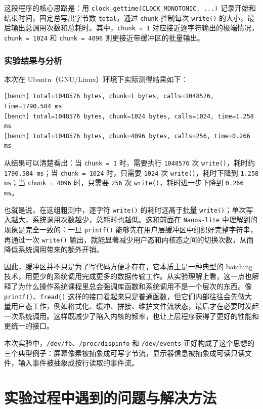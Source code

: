 \documentclass[a4paper]{article}
\begin{document}
这段程序的核心思路是：用 \texttt{clock\_gettime(CLOCK\_MONOTONIC, ...)} 记录开始和结束时间，固定总写出字节数 \texttt{total}，通过 \texttt{chunk} 控制每次 \texttt{write()} 的大小，最后输出总调用次数和总耗时。其中，\texttt{chunk = 1} 对应接近逐字符输出的极端情况，\texttt{chunk = 1024} 和 \texttt{chunk = 4096} 则更接近带缓冲区的批量输出。

\subsubsection*{实验结果与分析}
本次在 Ubuntu（GNU/Linux）环境下实际测得结果如下：
\begin{lstlisting}[language={}]
[bench] total=1048576 bytes, chunk=1 bytes, calls=1048576, time=1790.584 ms
[bench] total=1048576 bytes, chunk=1024 bytes, calls=1024, time=1.258 ms
[bench] total=1048576 bytes, chunk=4096 bytes, calls=256, time=0.266 ms
\end{lstlisting}

从结果可以清楚看出：当 \texttt{chunk = 1} 时，需要执行 \texttt{1048576} 次 \texttt{write()}，耗时约 \texttt{1790.584 ms}；当 \texttt{chunk = 1024} 时，只需要 \texttt{1024} 次 \texttt{write()}，耗时下降到 \texttt{1.258 ms}；当 \texttt{chunk = 4096} 时，只需要 \texttt{256} 次 \texttt{write()}，耗时进一步下降到 \texttt{0.266 ms}。

也就是说，在这组粗测中，逐字符 \texttt{write()} 的耗时远高于批量 \texttt{write()}；单次写入越大，系统调用次数越少，总耗时也越低。这和前面在 \texttt{Nanos-lite} 中理解到的现象是完全一致的：一旦 \texttt{printf()} 能够先在用户层缓冲区中组织好完整字符串，再通过一次 \texttt{write()} 输出，就能显著减少用户态和内核态之间的切换次数，从而降低系统调用带来的额外开销。

因此，缓冲区并不只是为了写代码方便才存在，它本质上是一种典型的 batching 技术，用更少的系统调用完成更多的数据传输工作。从实验理解上看，这一点也解释了为什么操作系统课程里总会强调库函数和系统调用不是一个层次的东西。像 \texttt{printf()}、\texttt{fread()} 这样的接口看起来只是普通函数，但它们内部往往会先做大量用户态工作，例如格式化、缓冲、拼接、维护文件流状态，最后才在必要时发起一次系统调用。这样既减少了陷入内核的频率，也让上层程序获得了更好的性能和更统一的接口。

本次实验中，\texttt{/dev/fb}、\texttt{/proc/dispinfo} 和 \texttt{/dev/events} 正好构成了这个思想的三个典型例子：屏幕像素被抽象成可写字节流，显示器信息被抽象成可读只读文件，输入事件被抽象成按行读取的事件流。

\section{实验过程中遇到的问题与解决方法}
\end{document}
